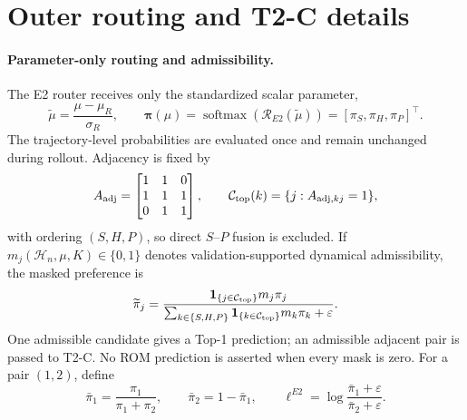 \section{Outer routing and T2-C details}
\label{app:routing}

\paragraph{Parameter-only routing and admissibility.}
The E2 router receives only the standardized scalar parameter,
\begin{equation}
 \widetilde\mu=\frac{\mu-\mu_R}{\sigma_R},\qquad
 \bm\pi(\mu)=\operatorname{softmax}(\mathcal R_{E2}(\widetilde\mu))
 =[\pi_S,\pi_H,\pi_P]^\top.
 \label{eq:app_e2_parameter_only}
\end{equation}
The trajectory-level probabilities are evaluated once and remain unchanged
during rollout. Adjacency is fixed by
\begin{equation}
 A_{\rm adj}=\begin{bmatrix}1&1&0\\1&1&1\\0&1&1\end{bmatrix},
 \qquad
 \mathcal C_{\rm top}(k)=\{j:A_{{\rm adj},kj}=1\},
 \label{eq:app_adjacency}
\end{equation}
with ordering $(S,H,P)$, so direct $S$--$P$ fusion is excluded. If
$m_j(\mathcal H_n,\mu,K)\in\{0,1\}$ denotes validation-supported dynamical
admissibility, the masked preference is
\begin{equation}
 \widetilde\pi_j=
 \frac{\mathbf 1_{\{j\in\mathcal C_{\rm top}\}}m_j\pi_j}
 {\sum_{k\in\{S,H,P\}}\mathbf 1_{\{k\in\mathcal C_{\rm top}\}}m_k\pi_k+\varepsilon}.
 \label{eq:app_masked_e2}
\end{equation}
One admissible candidate gives a Top-1 prediction; an admissible adjacent pair
is passed to T2-C. No ROM prediction is asserted when every mask is zero.
For a pair $(1,2)$, define
\begin{equation}
 \bar\pi_1=\frac{\pi_1}{\pi_1+\pi_2},\qquad
 \bar\pi_2=1-\bar\pi_1,\qquad
 \ell^{E2}=\log\frac{\bar\pi_1+\varepsilon}{\bar\pi_2+\varepsilon}.
 \label{eq:app_pair_logit}
\end{equation}

